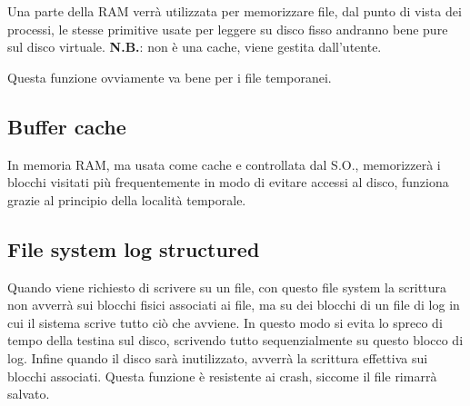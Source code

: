 \documentclass[a4paper, 12pt]{book}
\begin{document}
Una parte della RAM verrà utilizzata per memorizzare file,
dal punto di vista dei processi, le stesse primitive usate 
per leggere su disco fisso andranno bene pure sul disco
virtuale. \textbf{N.B.}: non è una cache, viene gestita 
dall'utente.

Questa funzione ovviamente va bene per i file temporanei.

\subsection{Buffer cache}

In memoria RAM, ma usata come cache e controllata dal 
S.O., memorizzerà i blocchi visitati più frequentemente 
in modo di evitare accessi al disco, funziona grazie al 
principio della località temporale.

\subsection{File system log structured}

Quando viene richiesto di scrivere su un file, con questo 
file system la scrittura non avverrà sui blocchi 
fisici associati ai file, ma su dei blocchi di un file di 
log in cui il sistema scrive tutto ciò che avviene. 
In questo modo si evita lo spreco di tempo della testina 
sul disco, scrivendo tutto sequenzialmente su questo blocco 
di log. Infine quando il disco sarà inutilizzato, avverrà 
la scrittura effettiva sui blocchi associati. Questa 
funzione è resistente ai crash, siccome il file rimarrà
salvato.  





    
    
\end{document}
